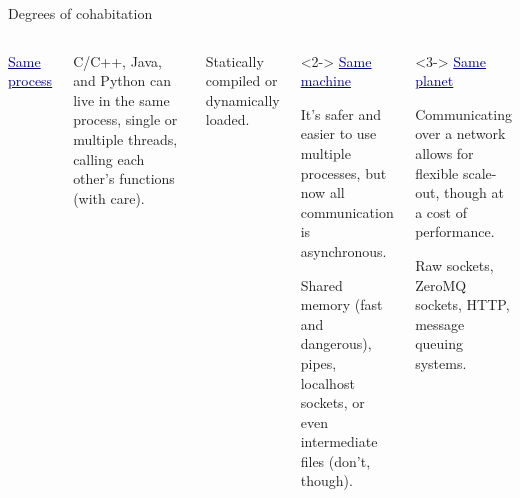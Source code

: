 \documentclass{beamer}
\begin{document}
\begin{frame}{Degrees of cohabitation}
\vspace{0.5 cm}
\begin{columns}[t]
\textcolor{darkblue}{\underline{Same process}} \hfill \mbox{ }

\vspace{0.25 cm}
C/C++, Java, and Python can live in the same process, single or multiple threads, calling each other's functions (with care).

\vspace{0.25 cm}
Statically compiled or dynamically loaded.

\begin{uncoverenv}<2->
\textcolor{darkblue}{\underline{Same machine}}

\vspace{0.25 cm}
It's safer and easier to use multiple processes, but now all communication is asynchronous.

\vspace{0.25 cm}
\vspace{2\baselineskip}
Shared memory (fast and dangerous), pipes, localhost sockets, or even intermediate files (don't, though).
\end{uncoverenv}

\begin{uncoverenv}<3->
\textcolor{darkblue}{\underline{Same planet}}

\vspace{0.25 cm}
Communicating over a network allows for flexible scale-out, though at a cost of performance.

\vspace{0.25 cm}
\vspace{2\baselineskip}
Raw sockets, ZeroMQ sockets, HTTP, message queuing systems.
\end{uncoverenv}
\end{columns}
\end{frame}
\end{document}
